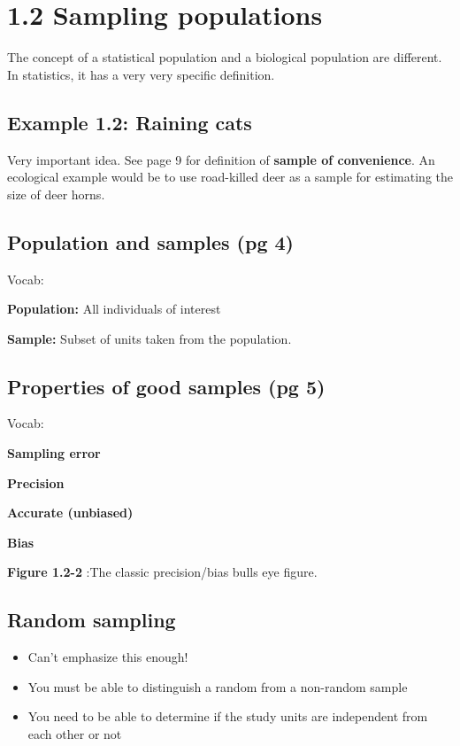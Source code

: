 \documentclass[]{book}
\providecommand{\tightlist}{%
  \setlength{\itemsep}{0pt}\setlength{\parskip}{0pt}}
\theoremstyle{definition}
\theoremstyle{definition}
\theoremstyle{definition}
\theoremstyle{remark}
\begin{document}
\section{1.2 Sampling populations}\label{sampling-populations}

The concept of a statistical population and a biological population are
different. In statistics, it has a very very specific definition.

\subsection{Example 1.2: Raining cats}\label{example-1.2-raining-cats}

Very important idea. See page 9 for definition of \textbf{sample of
convenience}. An ecological example would be to use road-killed deer as
a sample for estimating the size of deer horns.

\subsection{Population and samples (pg
4)}\label{population-and-samples-pg-4}

Vocab:

\textbf{Population:} All individuals of interest

\textbf{Sample:} Subset of units taken from the population.

\subsection{Properties of good samples (pg
5)}\label{properties-of-good-samples-pg-5}

Vocab:

\textbf{Sampling error}

\textbf{Precision}

\textbf{Accurate (unbiased)}

\textbf{Bias}

\textbf{Figure 1.2-2} :The classic precision/bias bulls eye figure.

\subsection{Random sampling}\label{random-sampling}

\begin{itemize}
\tightlist
\item
  Can't emphasize this enough!
\item
  You must be able to distinguish a random from a non-random sample
\item
  You need to be able to determine if the study units are independent
  from each other or not
\end{itemize}
\end{document}
